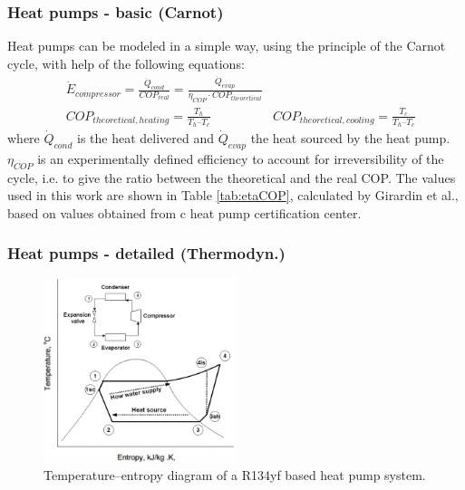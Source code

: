 \documentclass{article}
\begin{document}
\subsubsection{Heat pumps - basic (Carnot)}\label{sss:hp_carnot}
Heat pumps can be modeled in a simple way, using the principle of the Carnot cycle, with help of the following equations:
\begin{align}
    & \dot{E}_{compressor} = \frac{\dot{Q}_{cond}}{COP_{real}} = \frac{\dot{Q}_{evap}}{\eta_{COP} \cdot COP_{theoretical}} \\
    & COP_{theoretical, heating} =  \frac{T_{h}}{T_{h} – T_{c}}  
    & COP_{theoretical, cooling} =  \frac{T_{c}}{T_{h} – T_{c}} 
\end{align}
where $\dot{Q}_{cond}$ is the heat delivered and $\dot{Q}_{evap}$ the heat sourced by the heat pump. $\eta_{COP}$ is an experimentally defined efficiency to account for irreversibility of the cycle, i.e. to give the ratio between the theoretical and the real COP. The values used in this work are shown in Table \ref{tab:etaCOP}, calculated by Girardin et al.\cite{girardinEnerGisGeographicalInformation2010}, based on values obtained from c heat pump certification center\cite{NTBBuchsInstitut}. \\



\subsubsection{Heat pumps - detailed (Thermodyn.)}\label{sss:hp_thermo}

\begin{figure}[htp]
	\centering
	\includegraphics[width=0.5\textwidth]{HP_cylce_ref.png}
	\caption{Temperature–entropy diagram of a R134yf based heat pump system.}
	\label{fig:hp_ref}
\end{figure}
\end{document}

